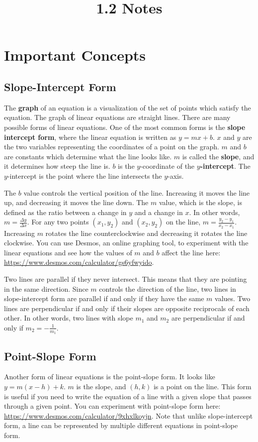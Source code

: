 \documentclass{article}
\title{1.2 Notes}
\author{}
\date{}
\begin{document}
    \maketitle
    \section*{Important Concepts}
    \subsection*{Slope-Intercept Form}
    The \textbf{graph} of an equation is a visualization of the set of points which satisfy the equation. The graph of linear equations are straight lines. There are many possible forms of linear equations. One of the most common forms is the \textbf{slope intercept form}, where the linear equation is written as $y = mx + b$. $x$ and $y$ are the two variables representing the coordinates of a point on the graph. $m$ and $b$ are constants which determine what the line looks like. $m$ is called the \textbf{slope}, and it determines how steep the line is. $b$ is the $y$-coordinate of the \textbf{$y$-intercept}. The $y$-intercept is the point where the line intersects the $y$-axis.

    The $b$ value controls the vertical position of the line. Increasing it moves the line up, and decreasing it moves the line down. The $m$ value, which is the slope, is defined as the ratio between a change in $y$ and a change in $x$. In other words, $m = \frac{\Delta y}{\Delta x}$. For any two points $(x_1, y_2)$ and $(x_2, y_2)$ on the line, $m = \frac{y_2 - y_1}{x_2 - x_1}$. Increasing $m$ rotates the line counterclockwise and decreasing it rotates the line clockwise. You can use Desmos, an online graphing tool, to experiment with the linear equations and see how the values of $m$ and $b$ affect the line here: \url{https://www.desmos.com/calculator/gs6yfwyido}.

    Two lines are parallel if they never intersect. This means that they are pointing in the same direction. Since $m$ controls the direction of the line, two lines in slope-intercept form are parallel if and only if they have the same $m$ values. Two lines are perpendicular if and only if their slopes are opposite reciprocals of each other. In other words, two lines with slope $m_1$ and $m_2$ are perpendicular if and only if $m_2 = -\frac{1}{m_1}$.
    \subsection*{Point-Slope Form}
    Another form of linear equations is the point-slope form. It looks like $y = m(x - h) + k$. $m$ is the slope, and $(h, k)$ is a point on the line. This form is useful if you need to write the equation of a line with a given slope that passes through a given point. You can experiment with point-slope form here: \url{https://www.desmos.com/calculator/9xhxlkoyjn}. Note that unlike slope-intercept form, a line can be represented by multiple different equations in point-slope form.
\end{document}
